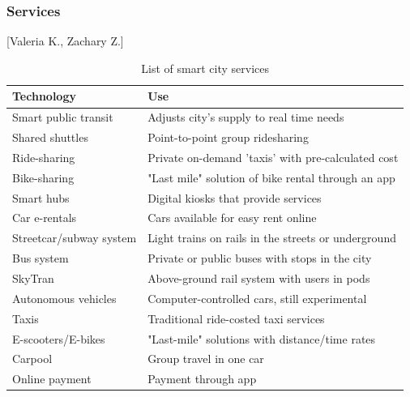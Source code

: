 \documentclass[12pt]{article}                       %
\begin{document}
\subsubsection{Services}[Valeria K., Zachary Z.] \label{sec:smart_city_services}
\begin{table}[H]
    \centering
    \small
    \begin{tabular}{l|l}
        \textbf{Technology} & \textbf{Use} \\
        \hline{}
        
        Smart public transit &
        Adjusts city's supply to real time needs \\
        \hline{}
        
        Shared shuttles &
        Point-to-point group ridesharing \\
        \hline{}
        
        Ride-sharing &
        Private on-demand 'taxis' with pre-calculated cost \\
        \hline{}
        
        Bike-sharing &
        "Last mile" solution of bike rental through an app \\
        \hline{}
        
        Smart hubs &
        Digital kiosks that provide services \\
        \hline{}
        
        Car e-rentals &
        Cars available for easy rent online \\
        \hline{}
        
        Streetcar/subway system &
        Light trains on rails in the streets or underground \\
        \hline{}
        
        Bus system &
        Private or public buses with stops in the city \\
        \hline{}
        
        SkyTran &
        Above-ground rail system with users in pods \\
        \hline{}
        
        Autonomous vehicles &
        Computer-controlled cars, still experimental \\
        \hline{}
        
        Taxis &
        Traditional ride-costed taxi services \\
        \hline{}
        
        E-scooters/E-bikes &
        "Last-mile" solutions with distance/time rates \\
        \hline{}
        
        Carpool &
        Group travel in one car \\
        \hline{}
        
        Online payment &
        Payment through app
    \end{tabular}
    \caption{List of smart city services}
    \label{tab:smart_city_services}
\end{table}
\end{document}
